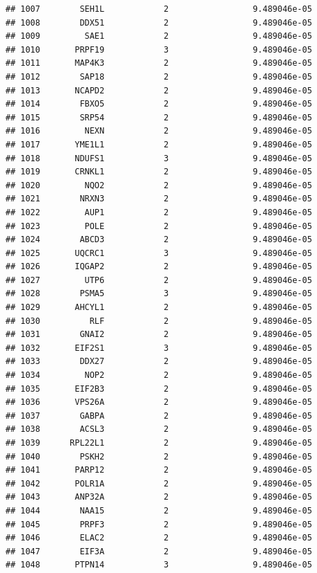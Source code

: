 \documentclass[
]{article}
\begin{document}
\begin{verbatim}
## 1007        SEH1L            2                 9.489046e-05
## 1008        DDX51            2                 9.489046e-05
## 1009         SAE1            2                 9.489046e-05
## 1010       PRPF19            3                 9.489046e-05
## 1011       MAP4K3            2                 9.489046e-05
## 1012        SAP18            2                 9.489046e-05
## 1013       NCAPD2            2                 9.489046e-05
## 1014        FBXO5            2                 9.489046e-05
## 1015        SRP54            2                 9.489046e-05
## 1016         NEXN            2                 9.489046e-05
## 1017       YME1L1            2                 9.489046e-05
## 1018       NDUFS1            3                 9.489046e-05
## 1019       CRNKL1            2                 9.489046e-05
## 1020         NQO2            2                 9.489046e-05
## 1021        NRXN3            2                 9.489046e-05
## 1022         AUP1            2                 9.489046e-05
## 1023         POLE            2                 9.489046e-05
## 1024        ABCD3            2                 9.489046e-05
## 1025       UQCRC1            3                 9.489046e-05
## 1026       IQGAP2            2                 9.489046e-05
## 1027         UTP6            2                 9.489046e-05
## 1028        PSMA5            3                 9.489046e-05
## 1029       AHCYL1            2                 9.489046e-05
## 1030          RLF            2                 9.489046e-05
## 1031        GNAI2            2                 9.489046e-05
## 1032       EIF2S1            3                 9.489046e-05
## 1033        DDX27            2                 9.489046e-05
## 1034         NOP2            2                 9.489046e-05
## 1035       EIF2B3            2                 9.489046e-05
## 1036       VPS26A            2                 9.489046e-05
## 1037        GABPA            2                 9.489046e-05
## 1038        ACSL3            2                 9.489046e-05
## 1039      RPL22L1            2                 9.489046e-05
## 1040        PSKH2            2                 9.489046e-05
## 1041       PARP12            2                 9.489046e-05
## 1042       POLR1A            2                 9.489046e-05
## 1043       ANP32A            2                 9.489046e-05
## 1044        NAA15            2                 9.489046e-05
## 1045        PRPF3            2                 9.489046e-05
## 1046        ELAC2            2                 9.489046e-05
## 1047        EIF3A            2                 9.489046e-05
## 1048       PTPN14            3                 9.489046e-05

\end{verbatim}
\end{document}
